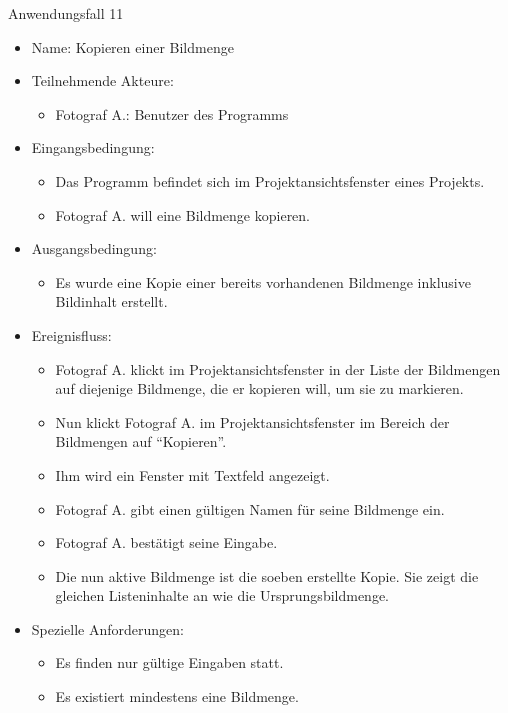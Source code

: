 	\begin{description}
		\item[Anwendungsfall 11]
	\end{description}
	
	\begin{itemize}
		\item Name: Kopieren einer Bildmenge
		\item Teilnehmende Akteure:
		\begin{itemize}
			\item	Fotograf A.: Benutzer des Programms		
		\end{itemize}
		\item Eingangsbedingung:
		\begin{itemize}
			\item	Das Programm befindet sich im Projektansichtsfenster eines Projekts.
			\item Fotograf A. will eine Bildmenge kopieren.
		\end{itemize}
		\item Ausgangsbedingung:
		\begin{itemize}
			\item	Es wurde eine Kopie einer bereits vorhandenen Bildmenge inklusive Bildinhalt erstellt.	
		\end{itemize}
		\item Ereignisfluss:
		\begin{itemize}
			\item Fotograf A. klickt im Projektansichtsfenster in der Liste der Bildmengen auf diejenige Bildmenge, die er kopieren will, um sie zu markieren.		
			\item Nun klickt Fotograf A. im Projektansichtsfenster im Bereich der Bildmengen auf "`Kopieren"'.
			\item Ihm wird ein Fenster mit Textfeld angezeigt.
			\item Fotograf A. gibt einen gültigen Namen für seine Bildmenge ein.
			\item Fotograf A. bestätigt seine Eingabe.
			\item Die nun aktive Bildmenge ist die soeben erstellte Kopie. Sie zeigt die gleichen Listeninhalte an wie die Ursprungsbildmenge.
		\end{itemize}
		\item Spezielle Anforderungen:
		\begin{itemize}
			\item	Es finden nur gültige Eingaben statt.
			\item Es existiert mindestens eine Bildmenge.
		\end{itemize}			
	\end{itemize}
	
